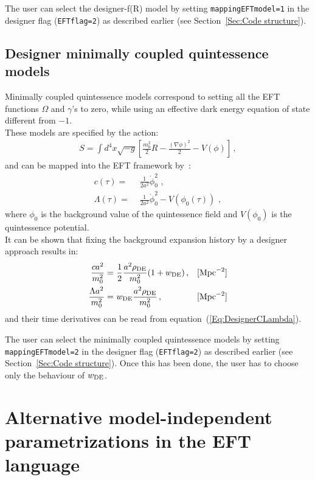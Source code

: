 \documentclass[prd,nofootinbib,showpacs]{revtex4}
\def\l{\left}
\def\r{\right}
\begin{document}
{The user can select the designer-f(R) model by setting  \verb|mappingEFTmodel=1| in the  designer flag (\verb|EFTflag=2|)  as described earlier (see Section~\ref{Sec:Code structure}).


\subsection{Designer minimally coupled quintessence models}\label{SubSec:DesignerMc5e}
%
Minimally coupled quintessence models correspond to setting all the EFT functions $\Omega$ and $\gamma$'s to zero, while using an effective dark energy equation of state different from $-1$. \\
These models are specified by the action:
%
\begin{align}
S = \int{}d^4x\sqrt{-g}\l[\frac{m_0^2}{2}R-\frac{(\nabla\phi)^2}{2}-V(\phi)\r] \,,
\end{align}
%
and can be mapped into the EFT framework by~\cite{Gubitosi:2012hu, Bloomfield:2012ff}:
%
\begin{align}
c(\tau)  =&\,\, \frac{1}{2 a^2} \dot{\phi}_0^2 \,\,, \nonumber \\
\Lambda(\tau) =&\,\, \frac{1}{2a^2} \dot{\phi}_0^2 -V\left(\phi_0(\tau)\right) \,\,,
\end{align}
%
where $\phi_0$ is the background value of the quintessence field and $V\left(\phi_0\right)$ is the quintessence potential. \\
It can be shown that fixing the background expansion history by a designer approach results in:
%
\begin{align}
\frac{c a^2}{m_0^2} =&\,\, \frac{1}{2}\frac{a^2 \rho_{\rm DE}}{m_0^2}(1+w_{\rm DE})\, , & &   [\text{Mpc}^{-2}] \nonumber \\
%
 \frac{\Lambda a^2}{m_0^2} =&\,\,  w_{\rm DE}\frac{a^2\rho_{\rm DE}}{m_0^2}\, , & & [\text{Mpc}^{-2}]  
\end{align}
%
and their time derivatives can be read from equation~(\ref{Eq:DesignerCLambda}). 

The user can select the minimally coupled quintessence models by setting  \verb|mappingEFTmodel=2| in the  designer flag (\verb|EFTflag=2|) as described earlier (see Section~\ref{Sec:Code structure}). Once this has been done, the user has to choose  only the behaviour of $w_{\rm DE}$.

\section{Alternative model-independent parametrizations in the EFT language} \label{Alternative}

}
\end{document}
